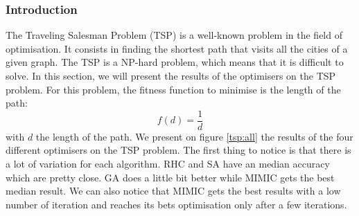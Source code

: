 \documentclass[10pt]{article}
\begin{document}
			\subsubsection*{Introduction}
				The Traveling Salesman Problem (TSP) is a well-known problem in the field of optimisation. It consists in finding the shortest path that visits all the cities of a given graph. The TSP is a NP-hard problem, which means that it is difficult to solve. In this section, we will present the results of the optimisers on the TSP problem.
				For this problem, the fitness function to minimise is the length of the path:
				\begin{equation}
					f(d) = \frac{1}{d}
				\end{equation}
				with $d$ the length of the path.
				We present on figure \ref{tsp:all} the results of the four different optimisers on the TSP problem. The first thing to notice is that there is a lot of variation for each algorithm. RHC and SA have an median accuracy which are pretty close. GA does a little bit better while MIMIC gets the best median result. We can also notice that MIMIC gets the best results with a low number of iteration and reaches its bets optimisation only after a few iterations.
\end{document}
